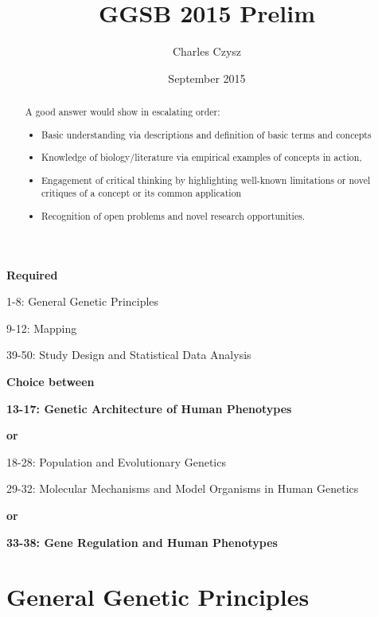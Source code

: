 \documentclass{tufte-handout}
\title{GGSB 2015 Prelim} %
\author[The Tufte-LaTeX Developers]{Charles Czysz}
\date{September 2015} %
\theoremstyle{noparens}
\begin{document}
\maketitle%

\noindent
\textbf{Required}

1-8: General Genetic Principles

9-12: Mapping

39-50: Study Design and Statistical Data Analysis

\vspace*{1\baselineskip}

\noindent
\textbf{Choice between}

\textbf{13-17: Genetic Architecture of Human Phenotypes}

\noindent
\textbf{or}

18-28: Population and Evolutionary Genetics

\vspace*{1\baselineskip}

29-32: Molecular Mechanisms and Model Organisms in Human Genetics

\noindent
\textbf{or}

\textbf{33-38: Gene Regulation and Human Phenotypes}

\vspace*{4\baselineskip}
\begin{abstract}
\noindent
A good answer would show in escalating order: 
\begin{itemize}
\item Basic understanding via descriptions and definition of basic terms and concepts 
\item Knowledge of biology/literature via empirical examples of concepts in action, 
\item Engagement of critical thinking by highlighting well-known limitations or novel critiques of a concept or its common application 
\item Recognition of open problems and novel research opportunities.
\end{itemize}

\end{abstract}

\newpage

\tableofcontents 

\newpage
 
\section{General Genetic Principles}\label{sec:gen-genetic}
\end{document}

